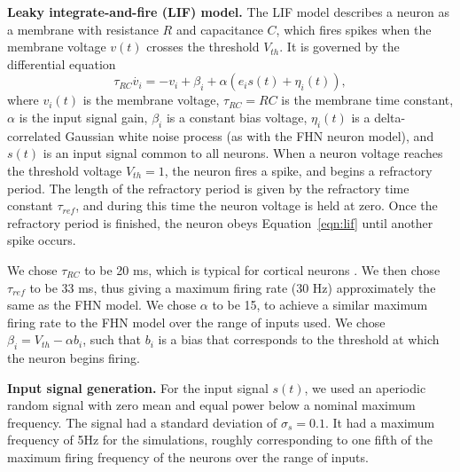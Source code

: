 \documentclass[12pt]{article}
\begin{document}
\textbf{Leaky integrate-and-fire (LIF) model.} The LIF model describes a neuron as a membrane with resistance $R$ and capacitance $C$, which fires spikes when the membrane voltage $v(t)$ crosses the threshold $V_{th}$. It is governed by the differential equation
\begin{equation}
  \tau_{RC} \dot{v_i} = -v_i + \beta_i + \alpha \left( e_i s(t) + \eta_i(t) \right),
  \label{eqn:lif}
\end{equation}
where $v_i(t)$ is the membrane voltage, $\tau_{RC} = RC$ is the membrane time constant, $\alpha$ is the input signal gain, $\beta_i$ is a constant bias voltage, $\eta_i(t)$ is a delta-correlated Gaussian white noise process (as with the FHN neuron model), and $s(t)$ is an input signal common to all neurons. When a neuron voltage reaches the threshold voltage $V_{th} = 1$, the neuron fires a spike, and begins a refractory period. The length of the refractory period is given by the refractory time constant $\tau_{ref}$, and during this time the neuron voltage is held at zero. Once the refractory period is finished, the neuron obeys Equation~\ref{eqn:lif} until another spike occurs.

We chose $\tau_{RC}$ to be 20 ms, which is typical for cortical neurons \citep{McCormick1985}. We then chose $\tau_{ref}$ to be 33 ms, thus giving a maximum firing rate (30 Hz) approximately the same as the FHN model. We chose $\alpha$ to be 15, to achieve a similar maximum firing rate to the FHN model over the range of inputs used. We chose $\beta_i = V_{th} - \alpha b_i$, such that $b_i$ is a bias that corresponds to the threshold at which the neuron begins firing.

\textbf{Input signal generation.} For the input signal $s(t)$, we used an aperiodic random signal with zero mean and equal power below a nominal maximum frequency. The signal had a standard deviation of $\sigma_s = 0.1$. It had a maximum frequency of 5Hz for the simulations, roughly corresponding to one fifth of the maximum firing frequency of the neurons over the range of inputs.
\end{document}
